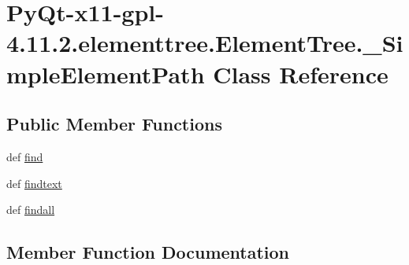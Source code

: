 \hypertarget{classPyQt-x11-gpl-4_811_82_1_1elementtree_1_1ElementTree_1_1__SimpleElementPath}{}\section{Py\+Qt-\/x11-\/gpl-\/4.11.2.elementtree.\+Element\+Tree.\+\_\+\+Simple\+Element\+Path Class Reference}
\label{classPyQt-x11-gpl-4_811_82_1_1elementtree_1_1ElementTree_1_1__SimpleElementPath}
\subsection*{Public Member Functions}
\begin{DoxyCompactItemize}
\item 
def \hyperlink{classPyQt-x11-gpl-4_811_82_1_1elementtree_1_1ElementTree_1_1__SimpleElementPath_acccaef2b341f6a9d6900e7b2046e1255}{find}
\item 
def \hyperlink{classPyQt-x11-gpl-4_811_82_1_1elementtree_1_1ElementTree_1_1__SimpleElementPath_a085007bb12bb8a20c75172a5261aa228}{findtext}
\item 
def \hyperlink{classPyQt-x11-gpl-4_811_82_1_1elementtree_1_1ElementTree_1_1__SimpleElementPath_a11c06177471b6b3e5d14bd78d321a8fb}{findall}
\end{DoxyCompactItemize}


\subsection{Member Function Documentation}
\hypertarget{classPyQt-x11-gpl-4_811_82_1_1elementtree_1_1ElementTree_1_1__SimpleElementPath_acccaef2b341f6a9d6900e7b2046e1255}{}

